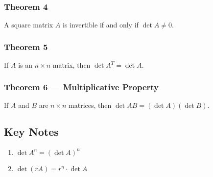 \documentclass{article}
\begin{document}
\subsubsection*{Theorem 4}
A square matrix $A$ is invertible if and only if $\det A \neq 0$.

\subsubsection*{Theorem 5}
If $A$ is an $n\times n$ matrix, then $\det A^T = \det A$.

\subsubsection*{Theorem 6 --- Multiplicative Property}
If $A$ and $B$ are $n\times n$ matrices, then $\det AB = (\det A)(\det B)$.

\subsection*{Key Notes}
\begin{enumerate}
    \item $\det A^n = {(\det A)}^n$
    \item $\det (rA) = r^n \cdot \det A$
\end{enumerate}
\end{document}
